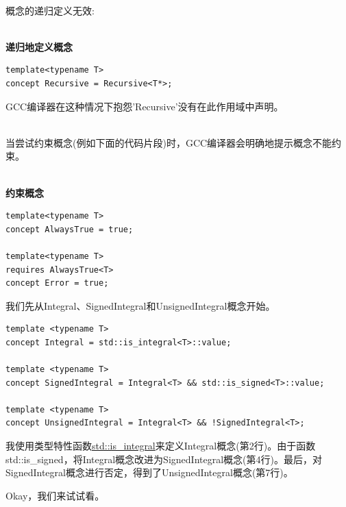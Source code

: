 \hspace*{\fill} \\ %
\begin{tcolorbox}[breakable,enhanced jigsaw,colback=red!5!white,colframe=red!75!black,title={不要递归地定义概念或尝试约束它们}]

概念的递归定义无效:

\hspace*{\fill} \\ %
\noindent
\textbf{递归地定义概念}
\begin{lstlisting}[style=styleCXX]
template<typename T>
concept Recursive = Recursive<T*>;
\end{lstlisting}

GCC编译器在这种情况下抱怨'Recursive'没有在此作用域中声明。

\hspace*{\fill} \\ %
当尝试约束概念(例如下面的代码片段)时，GCC编译器会明确地提示概念不能约束。

\hspace*{\fill} \\ %
\noindent
\textbf{约束概念}
\begin{lstlisting}[style=styleCXX]
template<typename T>
concept AlwaysTrue = true;

template<typename T>
requires AlwaysTrue<T>
concept Error = true;
\end{lstlisting}

\end{tcolorbox}

我们先从Integral、SignedIntegral和UnsignedIntegral概念开始。

\begin{lstlisting}[style=styleCXX]
template <typename T>
concept Integral = std::is_integral<T>::value;

template <typename T>
concept SignedIntegral = Integral<T> && std::is_signed<T>::value;

template <typename T>
concept UnsignedIntegral = Integral<T> && !SignedIntegral<T>;
\end{lstlisting}

我使用类型特性函数\href{https://en.cppreference.com/w/cpp/types/is_integral}{std::is\_integral}来定义Integral概念(第2行)。由于函数std::is\_signed，将Integral概念改进为SignedIntegral概念(第4行)。最后，对SignedIntegral概念进行否定，得到了UnsignedIntegral概念(第7行)。

Okay，我们来试试看。

